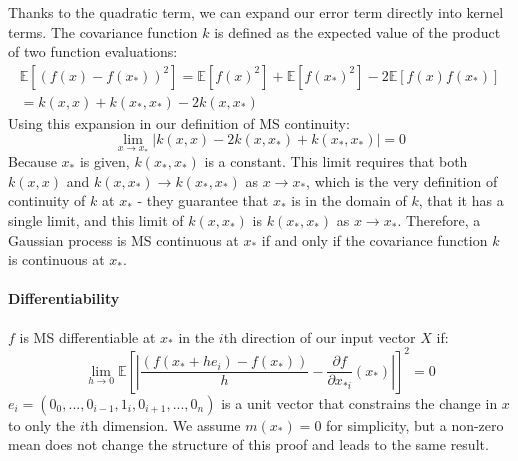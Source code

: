 Thanks to the quadratic term, we can expand our error term directly into kernel terms. The covariance function $k$ is defined as the expected value of the product of two function evaluations:
\begin{equation*}
    \begin{aligned}
        \mathbb{E}[(f(x) - f(x_*))^2] = \mathbb{E}[f(x)^2] + \mathbb{E}[f(x_*)^2] - 2\mathbb{E}[f(x)f(x_*)] \\
        = k(x, x) + k(x_*, x_*) - 2k(x, x_*)
    \end{aligned}
\end{equation*}
Using this expansion in our definition of MS continuity: 
\begin{equation} \label{eq:ms_continuity}
    \lim_{x \to x_*} | k(x, x) - 2k(x, x_*) + k(x_*, x_*) | = 0
\end{equation}
Because $x_*$ is given, $k(x_*, x_*)$ is a constant. This limit requires that both $k(x, x)$ and $k(x, x_*) \to k(x_*, x_*)$ as $x \to x_*$, which is the very definition of continuity of $k$ at $x_*$ - they guarantee that $x_*$ is in the domain of $k$, that it has a single limit, and this limit of $k(x, x_*)$ is $k(x_*, x_*)$ as $x \to x_*$. Therefore, a Gaussian process is MS continuous at $x_*$ if and only if the covariance function $k$ is continuous at $x_*$.  

\paragraph{Differentiability}
$f$ is MS differentiable at $x_*$ in the $i$th direction of our input vector $X$ if:
\begin{equation*}
    \lim_{h \to 0} \mathbb{E} \left[| \frac{(f(x_* + h e_i) - f(x_*))}{h} - \frac{\partial f}{\partial x_{*i}}(x_*) |\right]^2 = 0
\end{equation*}
$e_i = (0_0, ..., 0_{i-1}, 1_i, 0_{i+1}, ..., 0_n)$ is a unit vector that constrains the change in $x$ to only the $i$th dimension. We assume $m(x_*) = 0$ for simplicity, but a non-zero mean does not change the structure of this proof and leads to the same result.

